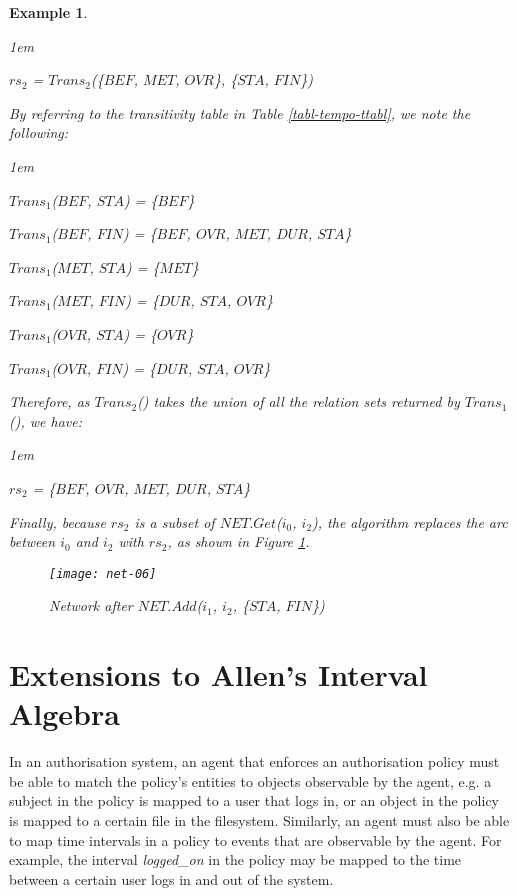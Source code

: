 \documentclass[11pt]{report}
\newtheorem{vexample}{Example}[chapter]
\newenvironment{vquote}
{
  \begin{list}{}{\leftmargin 1em}\item[]
}
{
  \end{list}
}
\begin{document}
\begin{vexample}
\begin{vquote}
              $rs_2$ = $Trans_2$(\{$BEF$, $MET$, $OVR$\}, \{$STA$, $FIN$\})
            \end{vquote}

            By referring to the transitivity table in Table
            \ref{tabl-tempo-ttabl}, we note the following:

            \begin{vquote}
              $Trans_1$($BEF$, $STA$) = \{$BEF$\}

              $Trans_1$($BEF$, $FIN$) = \{$BEF$, $OVR$, $MET$, $DUR$, $STA$\}

              $Trans_1$($MET$, $STA$) = \{$MET$\}

              $Trans_1$($MET$, $FIN$) = \{$DUR$, $STA$, $OVR$\}

              $Trans_1$($OVR$, $STA$) = \{$OVR$\}

              $Trans_1$($OVR$, $FIN$) = \{$DUR$, $STA$, $OVR$\}
            \end{vquote}

            Therefore, as $Trans_2$() takes the union of all the relation sets
            returned by $Trans_1$(), we have:

            \begin{vquote}
              $rs_2$ = \{$BEF$, $OVR$, $MET$, $DUR$, $STA$\}
            \end{vquote}

            Finally, because $rs_2$ is a subset of $NET.Get$($i_0$, $i_2$), the
            algorithm replaces the arc between $i_0$ and $i_2$ with $rs_2$, as
            shown in Figure \ref{figu-tempo-ntwk6}.

            \begin{figure}[tbhp]
              \begin{center}
                \texttt{[image: net-06]}
                \caption{Network after $NET.Add$($i_1$, $i_2$, \{$STA$, $FIN$\})}
                \label{figu-tempo-ntwk6}
              \end{center}
            \end{figure}
          \end{vexample}

    \section{Extensions to Allen's Interval Algebra}
      \label{sect-tempo-exten}

      In an authorisation system, an agent that enforces an authorisation
      policy must be able to match the policy's entities to objects observable
      by the agent, e.g. a subject in the policy is mapped to a user that logs
      in, or an object in the policy is mapped to a certain file in the
      filesystem. Similarly, an agent must also be able to map time intervals
      in a policy to events that are observable by the agent. For example,
      the interval {\em logged\_on} in the policy may be mapped to the time
      between a certain user logs in and out of the system.
\end{document}
